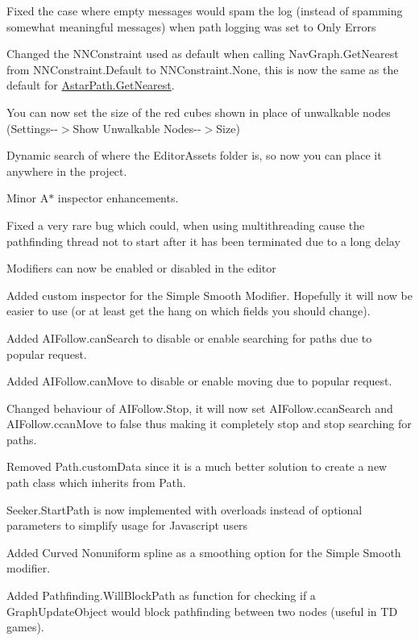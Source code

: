 \begin{DoxyItemize}
\begin{DoxyItemize}
\item Fixed the case where empty messages would spam the log (instead of spamming somewhat meaningful messages) when path logging was set to Only Errors
\item Changed the N\+N\+Constraint used as default when calling Nav\+Graph.\+Get\+Nearest from N\+N\+Constraint.\+Default to N\+N\+Constraint.\+None, this is now the same as the default for \mbox{\hyperlink{class_astar_path_a7d49736e7a25f4cf9fc24bdbec862359}{Astar\+Path.\+Get\+Nearest}}.
\item You can now set the size of the red cubes shown in place of unwalkable nodes (Settings-\/-\/$>$Show Unwalkable Nodes-\/-\/$>$Size)
\item Dynamic search of where the Editor\+Assets folder is, so now you can place it anywhere in the project.
\item Minor A$\ast$ inspector enhancements.
\item Fixed a very rare bug which could, when using multithreading cause the pathfinding thread not to start after it has been terminated due to a long delay
\item Modifiers can now be enabled or disabled in the editor
\item Added custom inspector for the Simple Smooth Modifier. Hopefully it will now be easier to use (or at least get the hang on which fields you should change).
\item Added A\+I\+Follow.\+can\+Search to disable or enable searching for paths due to popular request.
\item Added A\+I\+Follow.\+can\+Move to disable or enable moving due to popular request.
\item Changed behaviour of A\+I\+Follow.\+Stop, it will now set A\+I\+Follow.\+ccan\+Search and A\+I\+Follow.\+ccan\+Move to false thus making it completely stop and stop searching for paths.
\item Removed Path.\+custom\+Data since it is a much better solution to create a new path class which inherits from Path.
\item Seeker.\+Start\+Path is now implemented with overloads instead of optional parameters to simplify usage for Javascript users
\item Added Curved Nonuniform spline as a smoothing option for the Simple Smooth modifier.
\item Added Pathfinding.\+Will\+Block\+Path as function for checking if a Graph\+Update\+Object would block pathfinding between two nodes (useful in TD games).

\end{DoxyItemize}
\end{DoxyItemize}
